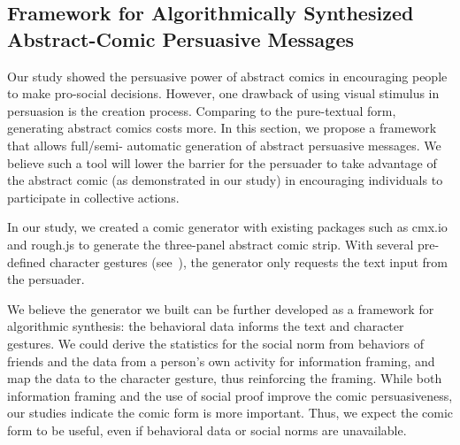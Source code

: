 
 \subsection{Framework for Algorithmically Synthesized Abstract-Comic Persuasive Messages}
 Our study showed the persuasive power of abstract comics in encouraging people to make pro-social decisions. However, one drawback of using visual stimulus in persuasion is the creation process. Comparing to the pure-textual form, generating abstract comics costs more. In this section, we propose a framework that allows full/semi- automatic generation of abstract persuasive messages. We believe such a tool will lower the barrier for the persuader to take advantage of the abstract comic (as demonstrated in our study) in encouraging individuals to participate in collective actions.

 In our study, we created a comic generator with existing packages such as cmx.io and rough.js to generate the three-panel abstract comic strip. With several pre-defined character gestures (see~), the generator only requests the text input from the persuader.  

 We believe the generator we built can be further developed as a framework for algorithmic synthesis: the behavioral data informs the text and character gestures. We could derive the statistics for the social norm from behaviors of friends and the data from a person's own activity for information framing, and map the data to the character gesture, thus reinforcing the framing. While both information framing and the use of social proof improve the comic persuasiveness, our studies indicate the comic form is more important. Thus, we expect the comic form to be useful, even if behavioral data or social norms are unavailable.

